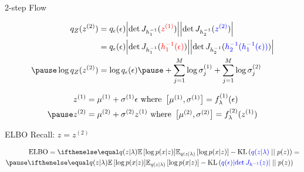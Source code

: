 \begin{frame}{2-step Flow}
\begin{small}
\begin{equation*}
\begin{aligned}
q_{Z}(z^{(2)}) &= q_{\epsilon}(\epsilon)\djac{h^{-1}_{1}}{\textcolor{red}{z^{(1)}}}\djac{h^{-1}_{2}}{\textcolor{blue}{z^{(2)}}} \\
&= q_{\epsilon}(\epsilon)\djac{h^{-1}_{1}}{\textcolor{red}{h^{-1}_{1}(\epsilon)}}\djac{h^{-1}_{2}}{\textcolor{blue}{h^{-1}_{2}(h^{-1}_{1}(\epsilon))}} \\ \pause
\log q_{Z}(z^{(2)}) &= \log q_{\epsilon}(\epsilon) \pause + \sum_{j=1}^{M}\log\sigma^{(1)}_{j} + \sum_{j=1}^{M}\log\sigma^{(2)}_{j}
\end{aligned}
\end{equation*}
\end{small}
\pause
\begin{equation*}
\begin{aligned}
z^{(1)} &= \mu^{(1)} + \sigma^{(1)}\epsilon \text{ where } \begin{bmatrix}\mu^{(1)}, \sigma^{(1)}\end{bmatrix} = f^{(1)}_{\lambda}(\epsilon) \\ \pause
z^{(2)} &= \mu^{(2)} + \sigma^{(2)}z^{(1)} \text{ where } \begin{bmatrix}\mu^{(2)}, \sigma^{(2)}\end{bmatrix} = f^{(2)}_{\lambda}(z^{(1)})
\end{aligned}
\end{equation*}
\end{frame}

\begin{frame}{ELBO}
Recall: $ z = z^{(2)} $
\begin{small}
\begin{equation*}
\begin{aligned}
&\ELBO = \E[q(z|\lambda)]{\log p(x|z)} - \KL{\textcolor{blue}{q(z|\lambda)}}{p(z)} = \\ \pause
&\E[q(z|\lambda)]{\log p(x|z)} - \KL{\textcolor{blue}{q(\epsilon)\djac{h^{-1}}{z}}}{p(z)}
\end{aligned}
\end{equation*}
\end{small}
\end{frame}

